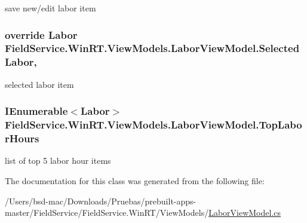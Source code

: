 save new/edit labor item 

\hypertarget{class_field_service_1_1_win_r_t_1_1_view_models_1_1_labor_view_model_a9846440c9cd2d7fe810368b92518f8b8}{
\subsubsection[{Selected\+Labor}]{\setlength{\rightskip}{0pt plus 5cm}override {\bf Labor} Field\+Service.\+Win\+R\+T.\+View\+Models.\+Labor\+View\+Model.\+Selected\+Labor\hspace{0.3cm}{\ttfamily [get]}, {\ttfamily [set]}}}\label{class_field_service_1_1_win_r_t_1_1_view_models_1_1_labor_view_model_a9846440c9cd2d7fe810368b92518f8b8}


selected labor item 

\hypertarget{class_field_service_1_1_win_r_t_1_1_view_models_1_1_labor_view_model_aaf06d26d7e7ef699a754d44dfb43a8ca}{
\subsubsection[{Top\+Labor\+Hours}]{\setlength{\rightskip}{0pt plus 5cm}I\+Enumerable$<${\bf Labor}$>$ Field\+Service.\+Win\+R\+T.\+View\+Models.\+Labor\+View\+Model.\+Top\+Labor\+Hours\hspace{0.3cm}{\ttfamily [get]}}}\label{class_field_service_1_1_win_r_t_1_1_view_models_1_1_labor_view_model_aaf06d26d7e7ef699a754d44dfb43a8ca}


list of top 5 labor hour items 



The documentation for this class was generated from the following file\+:\begin{DoxyCompactItemize}
\item 
/\+Users/bsd-\/mac/\+Downloads/\+Pruebas/prebuilt-\/apps-\/master/\+Field\+Service/\+Field\+Service.\+Win\+R\+T/\+View\+Models/\hyperlink{_win_r_t_2_view_models_2_labor_view_model_8cs}{Labor\+View\+Model.\+cs}\end{DoxyCompactItemize}
